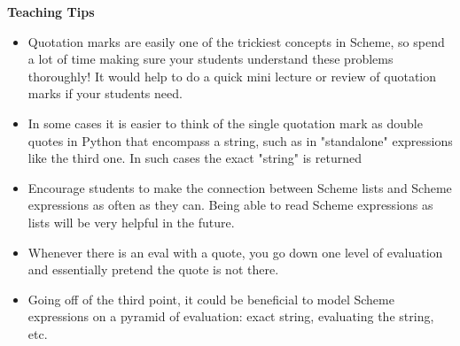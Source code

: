 \begin{blocksection}
\begin{guide}
\textbf{Teaching Tips}
\begin{itemize}
	\item Quotation marks are easily one of the trickiest concepts in Scheme, so spend a lot of time making sure your students understand these problems thoroughly! It would help to do a quick mini lecture or review of quotation marks if your students need.
	\item In some cases it is easier to think of the single quotation mark as double quotes in Python that encompass a string, such as in "standalone" expressions like the third one. In such cases the exact "string" is returned
	\item Encourage students to make the connection between Scheme lists and Scheme expressions as often as they can. Being able to read Scheme expressions as lists will be very helpful in the future.
	\item Whenever there is an eval with a quote, you go down one level of evaluation and essentially pretend the quote is not there.
	\item Going off of the third point, it could be beneficial to model Scheme expressions on a pyramid of evaluation: exact string, evaluating the string, etc.
\end{itemize}
\end{guide}
\end{blocksection}